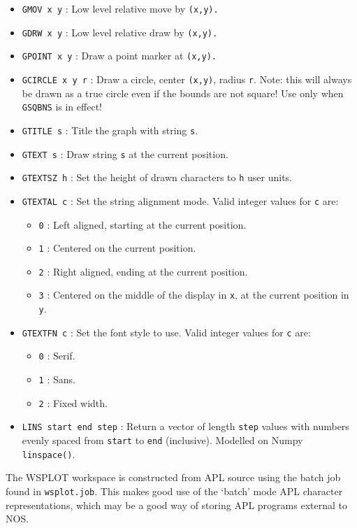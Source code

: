 \documentclass[a4paper,twoside,11pt]{article}
\newcommand{\newpara}{\par\vspace{4mm}\noindent}
\begin{document}
\begin{itemize}
\item \texttt{GMOV x y} : Low level relative move by \texttt{(x,y).}
\item \texttt{GDRW x y} : Low level relative draw by \texttt{(x,y).}
\item \texttt{GPOINT x y} : Draw a point marker at \texttt{(x,y).}
\item \texttt{GCIRCLE x y r} : Draw a circle, center \texttt{(x,y)}, radius \texttt{r}. Note: this will always be drawn as a true
circle even if the bounds are not square! Use only when  \texttt{GSQBNS} is in effect!
\item \texttt{GTITLE s} : Title the graph with string \texttt{s}.
\item \texttt{GTEXT s} : Draw string \texttt{s} at the current position. 
\item \texttt{GTEXTSZ h} : Set the height of drawn characters to \texttt{h} user units.
\item \texttt{GTEXTAL c} : Set the string alignment mode. Valid integer values for \texttt{c} are:
    \begin{itemize}
    \item \texttt{0} : Left aligned, starting at the current position.
    \item \texttt{1} : Centered on the current position.
    \item \texttt{2} : Right aligned, ending at the current position.
    \item \texttt{3} : Centered on the middle of the display in \texttt{x}, at the current position in \texttt{y}.
    \end{itemize}
\item \texttt{GTEXTFN c} : Set the font style to use. Valid integer values for \texttt{c} are:
    \begin{itemize}
    \item \texttt{0} : Serif.
    \item \texttt{1} : Sans.
    \item \texttt{2} : Fixed width.
    \end{itemize}
\item \texttt{LINS start end step} : Return a vector of  length \texttt{step} values with numbers evenly spaced from \texttt{start} to \texttt{end} (inclusive). Modelled on Numpy \texttt{linspace()}.
\end{itemize}

\newpara
The WSPLOT workspace is constructed from APL source using the batch job found in \texttt{wsplot.job}. 
This makes good use of the `batch' mode APL character representations, which may be a good way of storing 
APL programs external to NOS.
\end{document}
